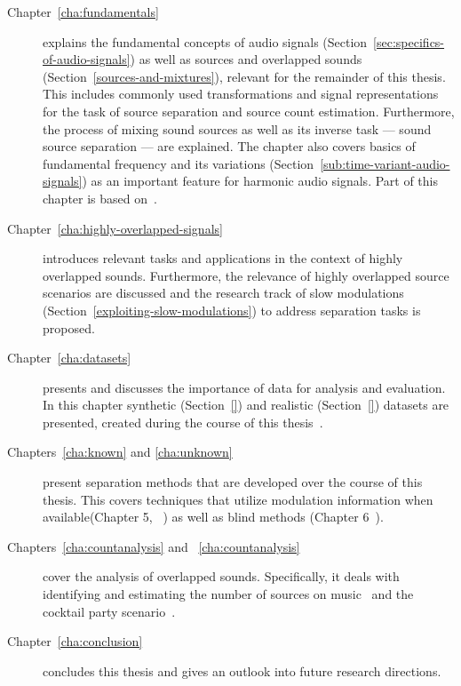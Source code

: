 \begin{description}
  \item[Chapter~\ref{cha:fundamentals}] explains the fundamental concepts of audio signals (Section~\ref{sec:specifics-of-audio-signals}) as well as sources and overlapped sounds (Section~\ref{sources-and-mixtures}), relevant for the remainder of this thesis.
  This includes commonly used transformations and signal representations for the task of source separation and source count estimation.
  Furthermore, the process of mixing sound sources as well as its inverse task --- sound source separation --- are explained.
  The chapter also covers basics of fundamental frequency and its variations (Section~\ref{sub:time-variant-audio-signals}) as an important feature for harmonic audio signals.
  Part of this chapter is based on~\cite{rafii18}.
  \item[Chapter~\ref{cha:highly-overlapped-signals}] introduces relevant tasks and applications in the context of highly overlapped sounds.
  Furthermore, the relevance of highly overlapped source scenarios are discussed and the research track of slow  modulations (Section~\ref{exploiting-slow-modulations}) to address separation tasks is proposed.
  \item[Chapter~\ref{cha:datasets}] presents and discusses the importance of data for analysis and evaluation.
  In this chapter synthetic (Section~\ref{}) and realistic (Section~\ref{}) datasets are presented, created during the course of this thesis~\cite{oss_wice, oss_unison, oss_libricount, stoeter15acm, liutkus17}.
  \item[Chapters~\ref{cha:known} and \ref{cha:unknown}] present separation methods that are developed over the course of this thesis.
  This covers techniques that utilize modulation information when available(Chapter 5, ~\cite{stoeter14, stoeter15icassp}) as well as blind methods (Chapter 6~\cite{stoeter16, liutkus17}).
  \item[Chapters~\ref{cha:countanalysis} and ~\ref{cha:countanalysis}] cover the analysis of overlapped sounds. Specifically, it deals with identifying and estimating the number of sources on music~\cite{schoeffler13, stoeter13} and the cocktail party scenario~\cite{stoeter19, stoeter18}.
  \item[Chapter~\ref{cha:conclusion}] concludes this thesis and gives an outlook into future research directions.
\end{description}
